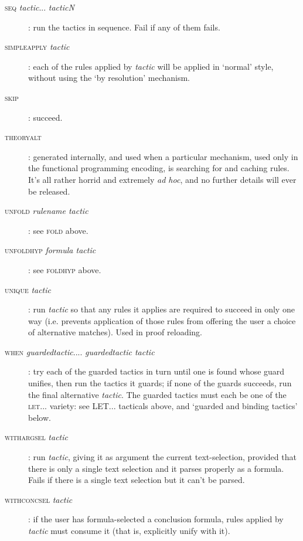 \begin{description}
\item [\textsc{seq} \textit{tactic}... \textit{tacticN}]: run the tactics in sequence. Fail if any of them fails.


\item [\textsc{simpleapply} \textit{tactic}]: each of the rules applied by \textit{tactic} will be applied in `normal' style, without using the `by resolution' mechanism.


\item [\textsc{skip}]: succeed.


\item [\textsc{theoryalt}]: generated internally, and used when a particular mechanism, used only in the functional programming encoding, is searching for and caching rules. It's all rather horrid and extremely \textit{ad hoc}, and no further details will ever be released.


\item [\textsc{unfold} \textit{rulename tactic}]: see \textsc{fold} above.
\item [\textsc{unfoldhyp} \textit{formula tactic}]: see \textsc{foldhyp} above.


\item [\textsc{unique} \textit{tactic}]: run \textit{tactic} so that any rules it applies are required to succeed in only one way (i.e. prevents application of those rules from offering the user a choice of alternative matches). Used in proof reloading.


\item [\textsc{when} \textit{guardedtactic}.... \textit{guardedtactic tactic}]: try each of the guarded tactics in turn until one is found whose guard unifies, then run the tactics it guards; if none of the guards succeeds, run the final alternative \textit{tactic}. The guarded tactics must each be one of the \textsc{let...} variety: see \textsc{LET...} tacticals above, and `guarded and binding tactics' below.


\item [\textsc{withargsel} \textit{tactic}]: run \textit{tactic}, giving it as argument the current text-selection, provided that there is only a single text selection and it parses properly as a formula. Fails if there is a single text selection but it can't be parsed.


\item [\textsc{withconcsel} \textit{tactic}]: if the user has formula-selected a conclusion formula, rules applied by \textit{tactic} must consume it (that is, explicitly unify with it).



\end{description}
